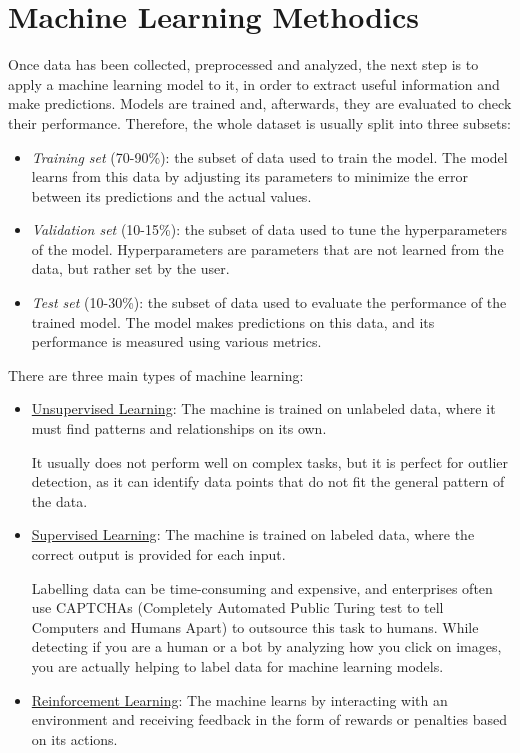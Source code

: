 \chapter{Machine Learning Methodics}

Once data has been collected, preprocessed and analyzed, the next step is to apply a machine learning model to it, in order to extract useful information and make predictions. Models are trained and, afterwards, they are evaluated to check their performance. Therefore, the whole dataset is usually split into three subsets:
\begin{itemize}
    \item \emph{Training set} (70-90\%): the subset of data used to train the model. The model learns from this data by adjusting its parameters to minimize the error between its predictions and the actual values.
    \item \emph{Validation set} (10-15\%): the subset of data used to tune the hyperparameters of the model. Hyperparameters are parameters that are not learned from the data, but rather set by the user.
    \item \emph{Test set} (10-30\%): the subset of data used to evaluate the performance of the trained model. The model makes predictions on this data, and its performance is measured using various metrics.
\end{itemize}

There are three main types of machine learning:
\begin{itemize}
    \item \ul{Unsupervised Learning}: The machine is trained on unlabeled data, where it must find patterns and relationships on its own.
    
    It usually does not perform well on complex tasks, but it is perfect for outlier detection, as it can identify data points that do not fit the general pattern of the data.    
    
    \item \ul{Supervised Learning}: The machine is trained on labeled data, where the correct output is provided for each input.
    
    Labelling data can be time-consuming and expensive, and enterprises often use CAPTCHAs (Completely Automated Public Turing test to tell Computers and Humans Apart) to outsource this task to humans. While detecting if you are a human or a bot by analyzing how you click on images, you are actually helping to label data for machine learning models.
    
    \item \ul{Reinforcement Learning}: The machine learns by interacting with an environment and receiving feedback in the form of rewards or penalties based on its actions.
\end{itemize}

